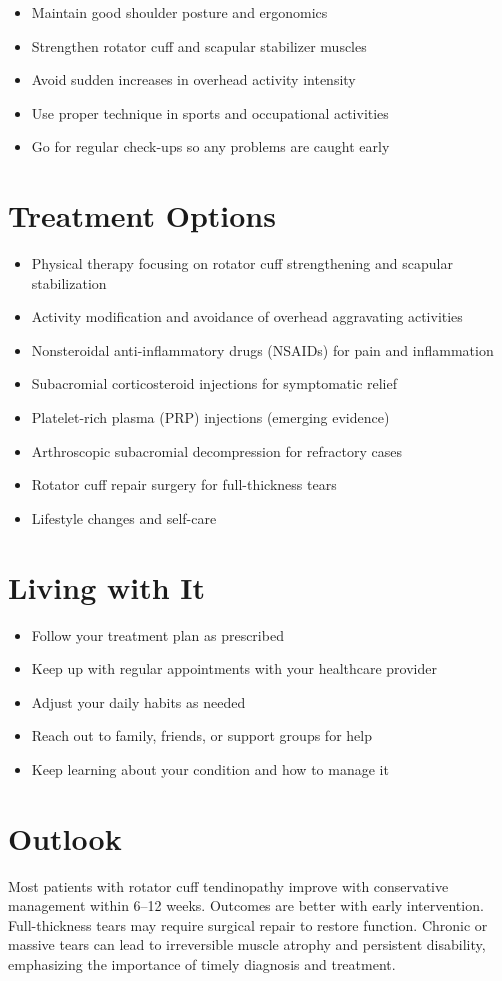 \begin{itemize}[noitemsep]
  \item Maintain good shoulder posture and ergonomics
  \item Strengthen rotator cuff and scapular stabilizer muscles
  \item Avoid sudden increases in overhead activity intensity
  \item Use proper technique in sports and occupational activities
  \item Go for regular check-ups so any problems are caught early
\end{itemize}

\section{Treatment Options}

\begin{itemize}[noitemsep]
  \item Physical therapy focusing on rotator cuff strengthening and scapular stabilization
  \item Activity modification and avoidance of overhead aggravating activities
  \item Nonsteroidal anti-inflammatory drugs (NSAIDs) for pain and inflammation
  \item Subacromial corticosteroid injections for symptomatic relief
  \item Platelet-rich plasma (PRP) injections (emerging evidence)
  \item Arthroscopic subacromial decompression for refractory cases
  \item Rotator cuff repair surgery for full-thickness tears
  \item Lifestyle changes and self-care
\end{itemize}

\section{Living with It}

\begin{itemize}[noitemsep]
  \item Follow your treatment plan as prescribed
  \item Keep up with regular appointments with your healthcare provider
  \item Adjust your daily habits as needed
  \item Reach out to family, friends, or support groups for help
  \item Keep learning about your condition and how to manage it
\end{itemize}

\section{Outlook}
Most patients with rotator cuff tendinopathy improve with conservative management within 6--12 weeks. Outcomes are better with early intervention. Full-thickness tears may require surgical repair to restore function. Chronic or massive tears can lead to irreversible muscle atrophy and persistent disability, emphasizing the importance of timely diagnosis and treatment.
